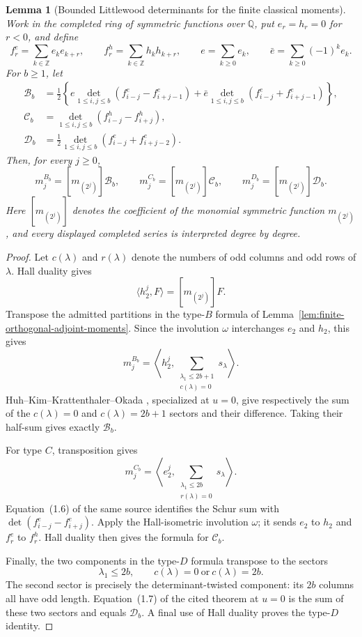 \documentclass[11pt,reqno]{amsart}
\theoremstyle{plain}
\newtheorem{lemma}[theorem]{Lemma}
\theoremstyle{definition}
\begin{document}
\begin{lemma}[Bounded Littlewood determinants for the finite classical moments]
\label{lem:bounded-littlewood-classical-moments}
Work in the completed ring of symmetric functions over $\mathbb Q$, put
$e_r=h_r=0$ for $r<0$, and define
\[
 f_r^e=\sum_{k\in\mathbb Z}e_ke_{k+r},\qquad
 f_r^h=\sum_{k\in\mathbb Z}h_kh_{k+r},\qquad
 e=\sum_{k\geq0}e_k,\qquad
 \bar e=\sum_{k\geq0}(-1)^ke_k.
\]
For $b\geq1$, let
\[
\begin{aligned}
 \mathcal B_b
 &=\frac12\left\{
 e\det_{1\leq i,j\leq b}(f^e_{i-j}-f^e_{i+j-1})
 +\bar e\det_{1\leq i,j\leq b}(f^e_{i-j}+f^e_{i+j-1})
 \right\},\\
 \mathcal C_b
 &=\det_{1\leq i,j\leq b}(f^h_{i-j}-f^h_{i+j}),\\
 \mathcal D_b
 &=\frac12\det_{1\leq i,j\leq b}(f^e_{i-j}+f^e_{i+j-2}).
\end{aligned}
\]
Then, for every $j\geq0$,
\[
 m_j^{B_b}=[m_{(2^j)}]\mathcal B_b,\qquad
 m_j^{C_b}=[m_{(2^j)}]\mathcal C_b,\qquad
 m_j^{D_b}=[m_{(2^j)}]\mathcal D_b.
\]
Here $[m_{(2^j)}]$ denotes the coefficient of the monomial symmetric
function $m_{(2^j)}$, and every displayed completed series is interpreted
degree by degree.
\end{lemma}

\begin{proof}
Let $c(\lambda)$ and $r(\lambda)$ denote the numbers of odd columns and odd
rows of $\lambda$.  Hall duality gives
\[
 \langle h_2^j,F\rangle=[m_{(2^j)}]F.
\]
Transpose the admitted partitions in the type-$B$ formula of
Lemma~\ref{lem:finite-orthogonal-adjoint-moments}.  Since the involution
$\omega$ interchanges $e_2$ and $h_2$, this gives
\[
 m_j^{B_b}
 =\left\langle h_2^j,
   \sum_{\substack{\lambda_1\leq2b+1\\c(\lambda)=0}}s_\lambda
  \right\rangle.
\]
Huh--Kim--Krattenthaler--Okada
\cite[Theorem~1.3, equations~(1.9)--(1.10)]{HKKO2025}, specialized at
$u=0$, give respectively the sum of the $c(\lambda)=0$ and
$c(\lambda)=2b+1$ sectors and their difference.  Taking their half-sum gives
exactly $\mathcal B_b$.

For type $C$, transposition gives
\[
 m_j^{C_b}
 =\left\langle e_2^j,
   \sum_{\substack{\lambda_1\leq2b\\r(\lambda)=0}}s_\lambda
  \right\rangle.
\]
Equation~(1.6) of the same source identifies the Schur sum with
$\det(f^e_{i-j}-f^e_{i+j})$.  Apply the Hall-isometric involution $\omega$;
it sends $e_2$ to $h_2$ and $f_r^e$ to $f_r^h$.  Hall duality then gives the
formula for $\mathcal C_b$.

Finally, the two components in the type-$D$ formula transpose to the sectors
\[
 \lambda_1\leq2b,\qquad c(\lambda)=0\ \text{or}\ c(\lambda)=2b.
\]
The second sector is precisely the determinant-twisted component: its $2b$
columns all have odd length.  Equation~(1.7) of the cited theorem at $u=0$
is the sum of these two sectors and equals $\mathcal D_b$.  A final use of
Hall duality proves the type-$D$ identity.
\end{proof}
\end{document}
